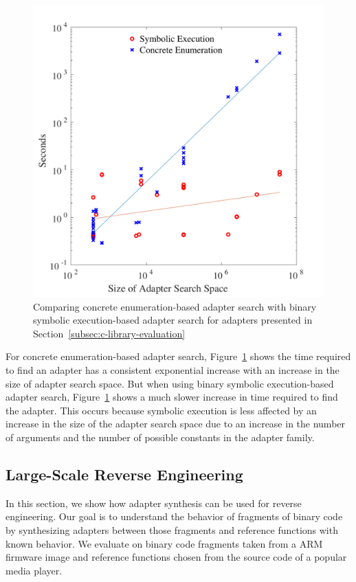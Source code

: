 \begin{figure}[t]
	\centering
	\caption{Comparing concrete enumeration-based adapter search with binary
	symbolic execution-based adapter search for adapters presented in
	Section~\ref{subsec:c-library-evaluation}}
	\label{fig:conc_vs_se}
	\includegraphics[width=\widthfactor\columnwidth]{chapters/adapter_synthesis/figures/conc_vs_se}
\end{figure}
%
For concrete enumeration-based adapter search, Figure~\ref{fig:conc_vs_se} shows the time required to find an adapter has a consistent exponential increase with an increase in the size of adapter search space.
%
But when using binary symbolic execution-based adapter search,
Figure~\ref{fig:conc_vs_se} shows a much slower increase in time
required to find the adapter.
%
This occurs because symbolic execution is less
affected by an increase in the size of the adapter search space
due to an increase in the number of arguments and the number of
possible constants in the adapter family.
%
\subsection{Large-Scale Reverse Engineering}
\label{subsec:eval_general}
In this section, we show how adapter synthesis can be used for reverse engineering.
Our goal is to understand the behavior of fragments of binary code by synthesizing adapters between those fragments and reference functions with known behavior.
We evaluate on binary code fragments taken from a ARM firmware image and reference functions
chosen from the source code of a popular media player.

